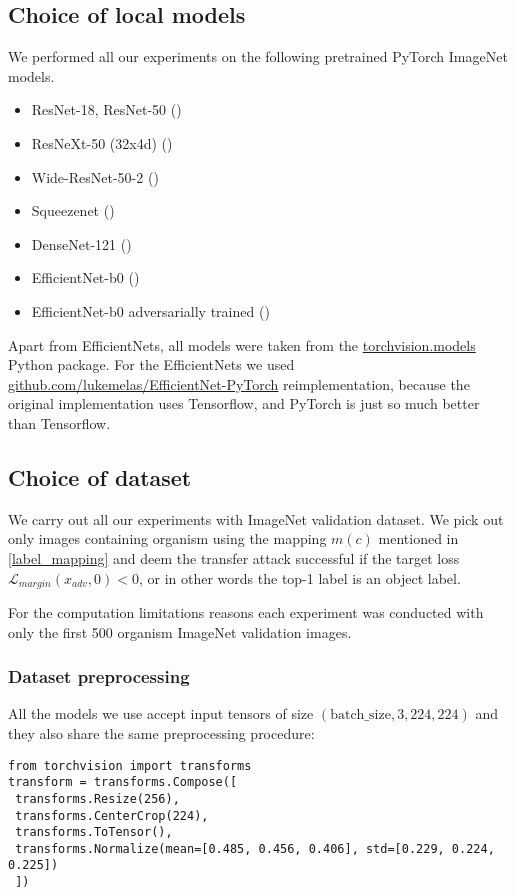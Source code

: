 \subsection{Choice of local models}
We performed all our experiments on the following pretrained PyTorch ImageNet models.

\begin{itemize}
    \item ResNet-18, ResNet-50 (\cite{he2015deep})
    \item ResNeXt-50 (32x4d) (\cite{xie2017aggregated})
    \item Wide-ResNet-50-2 (\cite{zagoruyko2017wide})
    \item Squeezenet (\cite{iandola2016squeezenet})
    \item DenseNet-121 (\cite{huang2018densely})
    \item EfficientNet-b0 (\cite{tan2020efficientnet})
    \item EfficientNet-b0 adversarially trained (\cite{tramer2020ensemble})
\end{itemize}

Apart from EfficientNets, all models were taken from the \href{https://pytorch.org/vision/stable/models.html}{torchvision.models} Python package. For the EfficientNets we used \href{https://github.com/lukemelas/EfficientNet-PyTorch}{github.com/lukemelas/EfficientNet-PyTorch} reimplementation, because the original implementation uses Tensorflow, and PyTorch is just so much better than Tensorflow.


\subsection{Choice of dataset}
We carry out all our experiments with ImageNet validation dataset. We pick out only images containing organism using the mapping $m(c)$ mentioned in \ref{label_mapping} and deem the transfer attack successful if the target loss $\mathcal{L}_{margin}(x_{adv}, 0) < 0$, or in other words the top-1 label is an object label.

For the computation limitations reasons each experiment was conducted with only the first 500 organism ImageNet validation images.

\subsubsection{Dataset preprocessing}
All the models we use accept input tensors of size $(\text{batch\_size}, 3, 224, 224)$ and they also share the same preprocessing procedure:
\begin{verbatim}
from torchvision import transforms
transform = transforms.Compose([
 transforms.Resize(256),
 transforms.CenterCrop(224),
 transforms.ToTensor(),
 transforms.Normalize(mean=[0.485, 0.456, 0.406], std=[0.229, 0.224, 0.225])
 ])
\end{verbatim}

